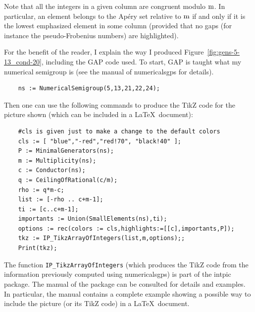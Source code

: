 Note that all the integers in a given column are congruent modulo $\operatorname{m}$. In particular, an element belongs to the Apéry set relative to $\operatorname{m}$ if and only if it is the lowest emphasized element %
in some column (provided that no gaps (for instance the pseudo-Frobenius numbers) are highlighted). 
\medskip

For the benefit of the reader, I explain the way I produced Figure~\ref{fig:gens-5-13_cond-20}, including the \textsf{GAP} code used. 
To start, \textsf{GAP} is taught what my numerical semigroup is (see the manual of \textsf{numericalsgps} for details).
\begin{verbatim}
	ns := NumericalSemigroup(5,13,21,22,24);
\end{verbatim}
Then one can use the following commands to produce the \textsf{TikZ} code for the picture shown (which can be included in a \LaTeX\ document):
\begin{code}\label{code:draw}
\begin{verbatim}
	#cls is given just to make a change to the default colors
	cls := [ "blue","-red","red!70", "black!40" ];
	P := MinimalGenerators(ns);
	m := Multiplicity(ns);
	c := Conductor(ns);
	q := CeilingOfRational(c/m);
	rho := q*m-c;
	list := [-rho .. c+m-1];
	ti := [c..c+m-1]; 
	importants := Union(SmallElements(ns),ti);
	options := rec(colors := cls,highlights:=[[c],importants,P]);
	tkz := IP_TikzArrayOfIntegers(list,m,options);;	
	Print(tkz);
\end{verbatim}
\end{code}
The function \texttt{IP\_TikzArrayOfIntegers} (which produces the \textsf{TikZ} code from the information previously computed using \textsf{numericalsgps}) is part of the \textsf{intpic} package. The manual of the package can be consulted for details and examples. In particular, the manual contains a complete example showing a possible way to include the picture (or its \textsf{TikZ} code) in a \LaTeX\ document.

